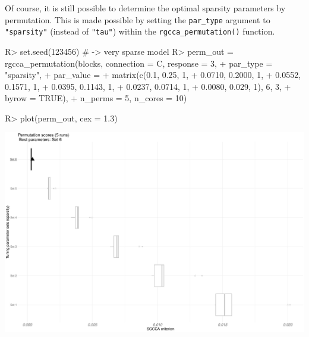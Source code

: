 \documentclass[
]{jss}
\begin{document}
\normalsize

Of course, it is still possible to determine the optimal sparsity
parameters by permutation. This is made possible by setting the
\texttt{par\_type} argument to \texttt{"sparsity"} (instead of
\texttt{"tau"}) within the \texttt{rgcca\_permutation()} function.

\footnotesize

\begin{CodeChunk}
\begin{CodeInput}
R> set.seed(123456) # -> very sparse model
R> perm_out = rgcca_permutation(blocks, connection = C, response = 3,
+                                 par_type = "sparsity",
+                                 par_value = 
+                                   matrix(c(0.1, 0.25, 1, 
+                                            0.0710, 0.2000, 1,
+                                            0.0552, 0.1571, 1, 
+                                            0.0395, 0.1143, 1,
+                                            0.0237, 0.0714, 1, 
+                                            0.0080, 0.029, 1), 6, 3, 
+                                          byrow = TRUE),
+                                 n_perms = 5, n_cores = 10)
\end{CodeInput}
\end{CodeChunk}

\normalsize

\footnotesize

\begin{CodeChunk}
\begin{CodeInput}
R> plot(perm_out, cex = 1.3)
\end{CodeInput}


\begin{center}\includegraphics{RGCCA_21022023_files/figure-latex/unnamed-chunk-48-1} \end{center}

\end{CodeChunk}
\end{document}
